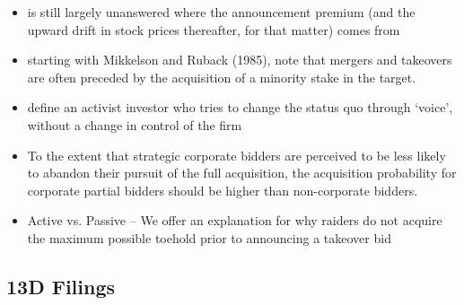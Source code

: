 \documentclass[12pt]{article}
\begin{document}
\begin{itemize}
        \item is still largely unanswered where the announcement premium (and the upward drift in stock prices thereafter, for that matter) comes from \citep{Greenwood2009}

        \item starting with Mikkelson and Ruback (1985), note that mergers and takeovers are often preceded by the acquisition of a minority stake in the target. \citep{Greenwood2009}

        \item define an activist investor who tries to change the status quo through ‘voice’, without a change in control of the firm \citep{Greenwood2009}

        \item To the extent that strategic corporate bidders are perceived to be less likely to abandon their pursuit of the full acquisition, the acquisition probability for corporate partial bidders should be higher than non-corporate bidders.

        \item Active vs. Passive -- We offer an explanation for why raiders do not acquire the maximum possible toehold prior to announcing a takeover bid \citep{Goldman2005}

    \end{itemize}


\subsection{13D Filings}
\end{document}
